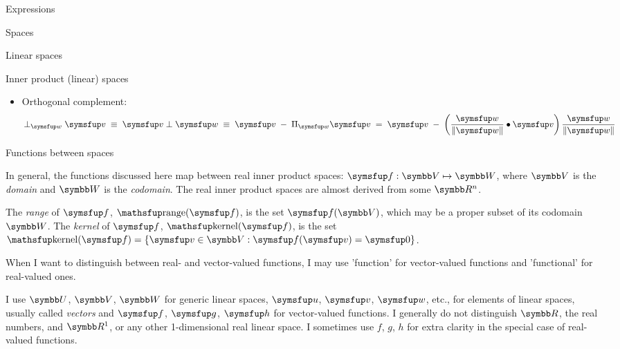 \documentclass[12pt]{PalisadesLakesArticle}
\begin{document}
\begin{plSection}{Expressions}
\begin{plSection}{Spaces}
\begin{plSection}{Linear spaces}
\begin{plSection}{Inner product (linear) spaces}
\begin{itemize}
\item Orthogonal complement:
\begin{equation}
\perp_{\Vector{w}} \Vector{v}
\; \equiv \;
\Vector{v} \perp \Vector{w}
\; \equiv \;
\Vector{v} \; - \; \Projection_{\Vector{w}} \Vector{v}
\; = \;
\Vector{v} \; - \; 
\left( 
\frac{\Vector{w}}{\|\Vector{w}\|} \bullet \Vector{v} 
\right) 
\frac{\Vector{w}}{\|\Vector{w}\|}
\end{equation}

\end{itemize}
\end{plSection}%
\end{plSection}%
\begin{plSection}{Functions between spaces}
\label{sec:Functions-between-spaces}

In general, the functions discussed here map between real inner product spaces:
$\Vector{f}:\Space{V} \mapsto \Space{W}$, where $\Space{V}$ is the
\textit{domain} and $\Space{W}$ is the \textit{codomain}.
The real inner product spaces are almost derived from some $\Reals^n$.

The \textit{range} of 
$\Vector{f}$, $\range(\Vector{f})$, is the set $\Vector{f}(\Space{V})$,
which may be a proper subset of its codomain $\Space{W}$.
The \textit{kernel} of
 $\Vector{f}$, $\kernel(\Vector{f})$, is the set
$\kernel(\Vector{f}) = \left\{ \Vector{v} \in \Space{V}
 : \Vector{f}(\Vector{v}) = \Vector{0} \right\}$.

When I want to distinguish between real- and vector-valued functions,
I may use 'function' for vector-valued functions and
'functional' for real-valued ones.

I use $\Space{U}$, $\Space{V}$, $\Space{W}$ for generic linear spaces,
$\Vector{u}$, $\Vector{v}$, $\Vector{w}$, etc., for elements of linear spaces,
usually called \textit{vectors}
and
$\Vector{f}$, $\Vector{g}$, $\Vector{h}$ for vector-valued functions.
I generally do not distinguish $\Reals$, the real numbers,
and $\Reals^1$, or any other 1-dimensional real linear space.
I sometimes use $f$, $g$, $h$ for extra clarity in the special
case of real-valued functions.


\end{plSection}
\end{plSection}
\end{plSection}
\end{document}
